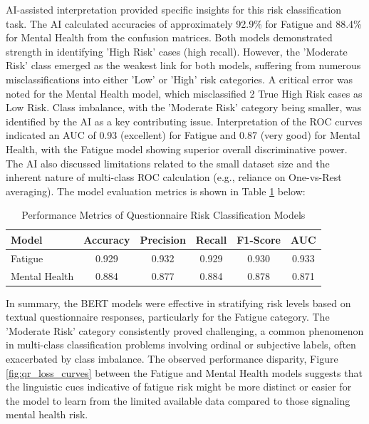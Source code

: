 AI-assisted interpretation provided specific insights for this risk classification task. The AI calculated accuracies of approximately 92.9\% for Fatigue and 88.4\% for Mental Health from the confusion matrices. Both models demonstrated strength in identifying 'High Risk' cases (high recall). However, the 'Moderate Risk' class emerged as the weakest link for both models, suffering from numerous misclassifications into either 'Low' or 'High' risk categories. A critical error was noted for the Mental Health model, which misclassified 2 True High Risk cases as Low Risk. Class imbalance, with the 'Moderate Risk' category being smaller, was identified by the AI as a key contributing issue. Interpretation of the ROC curves indicated an AUC of 0.93 (excellent) for Fatigue and 0.87 (very good) for Mental Health, with the Fatigue model showing superior overall discriminative power. The AI also discussed limitations related to the small dataset size and the inherent nature of multi-class ROC calculation (e.g., reliance on One-vs-Rest averaging). The model evaluation metrics is shown in Table \ref{tab:questionnaire_risk_performance} below:

\begin{table}[htbp]
    \centering
    \caption{Performance Metrics of Questionnaire Risk Classification Models}
    \label{tab:questionnaire_risk_performance}
    \begin{tabular}{lccccc}
        \hline
        \textbf{Model} & \textbf{Accuracy} & \textbf{Precision} & \textbf{Recall} & \textbf{F1-Score} & \textbf{AUC} \\
        \hline
        Fatigue & 0.929 & 0.932 & 0.929 & 0.930 & 0.933 \\
        Mental Health & 0.884 & 0.877 & 0.884 & 0.878 & 0.871 \\
        \hline
    \end{tabular}
\end{table}

In summary, the BERT models were effective in stratifying risk levels based on textual questionnaire responses, particularly for the Fatigue category. The 'Moderate Risk' category consistently proved challenging, a common phenomenon in multi-class classification problems involving ordinal or subjective labels, often exacerbated by class imbalance. The observed performance disparity, Figure \ref{fig:qr_loss_curves} between the Fatigue and Mental Health models suggests that the linguistic cues indicative of fatigue risk might be more distinct or easier for the model to learn from the limited available data compared to those signaling mental health risk.

